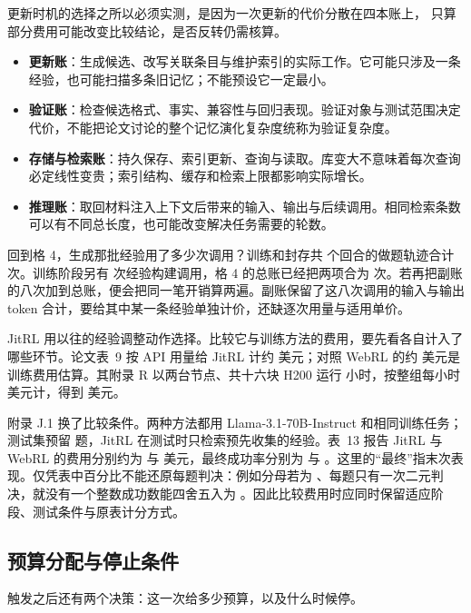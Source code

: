 更新时机的选择之所以必须实测，是因为一次更新的代价分散在四本账上，
只算部分费用可能改变比较结论，是否反转仍需核算。

\begin{itemize}
  \item \textbf{更新账}：生成候选、改写关联条目与维护索引的实际工作。它可能只涉及一条经验，也可能扫描多条旧记忆；不能预设它一定最小。
  \item \textbf{验证账}：检查候选格式、事实、兼容性与回归表现。验证对象与测试范围决定代价，不能把论文讨论的整个记忆演化复杂度统称为验证复杂度。
  \item \textbf{存储与检索账}：持久保存、索引更新、查询与读取。库变大不意味着每次查询必定线性变贵；索引结构、缓存和检索上限都影响实际增长。
  \item \textbf{推理账}：取回材料注入上下文后带来的输入、输出与后续调用。相同检索条数可以有不同总长度，也可能改变解决任务需要的轮数。
\end{itemize}

回到格 4，生成那批经验用了多少次调用？训练和封存共  个回合的做题轨迹合计  次。训练阶段另有  次经验构建调用，格 4 的总账已经把两项合为  次。若再把副账的八次加到总账，便会把同一笔开销算两遍。副账保留了这八次调用的输入与输出 token 合计，要给其中某一条经验单独计价，还缺逐次用量与适用单价。

JitRL 用以往的经验调整动作选择。比较它与训练方法的费用，要先看各自计入了哪些环节。论文表~9 按 API 用量给 JitRL 计约  美元；对照 WebRL 的约  美元是训练费用估算。其附录 R 以两台节点、共十六块 H200 运行  小时，按整组每小时  美元计，得到  美元\cite{jitrl-2601}。

附录 J.1 换了比较条件。两种方法都用 Llama-3.1-70B-Instruct 和相同训练任务；测试集预留  题，JitRL 在测试时只检索预先收集的经验。表~13 报告 JitRL 与 WebRL 的费用分别约为  与  美元，最终成功率分别为  与 。这里的“最终”指末次表现。仅凭表中百分比不能还原每题判决：例如分母若为 、每题只有一次二元判决，就没有一个整数成功数能四舍五入为 。因此比较费用时应同时保留适应阶段、测试条件与原表计分方式。

\subsection{预算分配与停止条件}
\label{sec:ch13-budget}

触发之后还有两个决策：这一次给多少预算，以及什么时候停。

